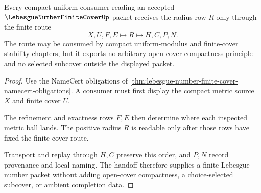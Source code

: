 \begin{theorem}
\label{thm:lebesgue-number-finite-cover-finite-cover-handoff}
Every compact-uniform consumer reading an accepted $\LebesgueNumberFiniteCoverUp$ packet receives the radius row $R$ only through the finite route
$$
X,U,F,E \longmapsto R \longmapsto H,C,P,N .
$$
The route may be consumed by compact uniform-modulus and finite-cover stability chapters, but it exports no arbitrary open-cover compactness principle and no selected subcover outside the displayed packet.
\end{theorem}
\begin{proof}
Use the NameCert obligations of \autoref{thm:lebesgue-number-finite-cover-namecert-obligations}. A consumer must first display the compact metric source $X$ and finite cover $U$.

The refinement and exactness rows $F,E$ then determine where each inspected metric ball lands. The positive radius $R$ is readable only after those rows have fixed the finite cover route.

Transport and replay through $H,C$ preserve this order, and $P,N$ record provenance and local naming. The handoff therefore supplies a finite Lebesgue-number packet without adding open-cover compactness, a choice-selected subcover, or ambient completion data.
\end{proof}




